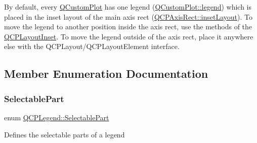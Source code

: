 By default, every \hyperlink{class_q_custom_plot}{Q\+Custom\+Plot} has one legend (\hyperlink{class_q_custom_plot_a4eadcd237dc6a09938b68b16877fa6af}{Q\+Custom\+Plot\+::legend}) which is placed in the inset layout of the main axis rect (\hyperlink{class_q_c_p_axis_rect_a949f803466619924c7018df4b511ae10}{Q\+C\+P\+Axis\+Rect\+::inset\+Layout}). To move the legend to another position inside the axis rect, use the methods of the \hyperlink{class_q_c_p_layout_inset}{Q\+C\+P\+Layout\+Inset}. To move the legend outside of the axis rect, place it anywhere else with the Q\+C\+P\+Layout/\+Q\+C\+P\+Layout\+Element interface. 

\subsection{Member Enumeration Documentation}
\hypertarget{class_q_c_p_legend_a5404de8bc1e4a994ca4ae69e2c7072f1}{}\label{class_q_c_p_legend_a5404de8bc1e4a994ca4ae69e2c7072f1} 
\subsubsection{\texorpdfstring{Selectable\+Part}{SelectablePart}}
{\footnotesize\ttfamily enum \hyperlink{class_q_c_p_legend_a5404de8bc1e4a994ca4ae69e2c7072f1}{Q\+C\+P\+Legend\+::\+Selectable\+Part}}

Defines the selectable parts of a legend

